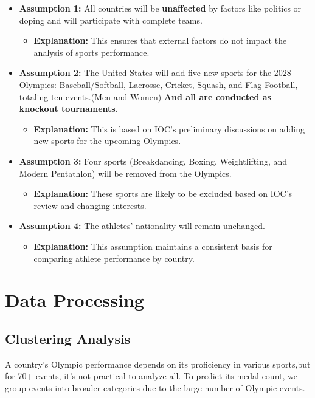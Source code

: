 \documentclass{mcmthesis}  %
\begin{document}
\begin{itemize}
    \item \textbf{Assumption 1:} All countries will be \textbf{unaffected} by factors like politics or doping and will participate with complete teams.
    \begin{itemize}
        \item \textbf{Explanation:} This ensures that external factors do not impact the analysis of sports performance.
    \end{itemize}
    
    \item \textbf{Assumption 2:} The United States will add five new sports for the 2028 Olympics: Baseball/Softball, Lacrosse, Cricket, Squash, and Flag Football, totaling ten events.(Men and Women)
    \textbf{And all are conducted as knockout tournaments.}
    \begin{itemize}
        \item \textbf{Explanation:} This is based on IOC's preliminary discussions on adding new sports for the upcoming Olympics.
    \end{itemize}
    
    \item \textbf{Assumption 3:} Four sports (Breakdancing, Boxing, Weightlifting, and Modern Pentathlon) will be removed from the Olympics.
    \begin{itemize}
        \item \textbf{Explanation:} These sports are likely to be excluded based on IOC's review and changing interests.
    \end{itemize}
    
    \item \textbf{Assumption 4:} The athletes' nationality will remain unchanged.
    \begin{itemize}
        \item \textbf{Explanation:} This assumption maintains a consistent basis for comparing athlete performance by country.
    \end{itemize}
\end{itemize}

\section{Data Processing}
\subsection{Clustering Analysis}
A country's Olympic performance depends on its proficiency in various sports,but for 70+ events, it's not practical to analyze all. To predict its medal count, we group events into broader categories due to the large number of Olympic events. 
\end{document}
